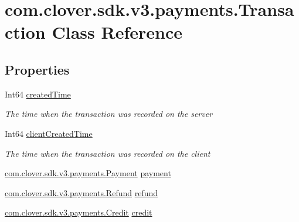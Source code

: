 \hypertarget{classcom_1_1clover_1_1sdk_1_1v3_1_1payments_1_1_transaction}{}\section{com.\+clover.\+sdk.\+v3.\+payments.\+Transaction Class Reference}
\label{classcom_1_1clover_1_1sdk_1_1v3_1_1payments_1_1_transaction}
\subsection*{Properties}
\begin{DoxyCompactItemize}
\item 
Int64 \hyperlink{classcom_1_1clover_1_1sdk_1_1v3_1_1payments_1_1_transaction_af6b65de96af4b8bc55484cdeab72186a}{created\+Time}
\begin{DoxyCompactList}\small\item\em The time when the transaction was recorded on the server \end{DoxyCompactList}\item 
Int64 \hyperlink{classcom_1_1clover_1_1sdk_1_1v3_1_1payments_1_1_transaction_a602c5a8c5bbbdc62370e8eb13b1a0f61}{client\+Created\+Time}
\begin{DoxyCompactList}\small\item\em The time when the transaction was recorded on the client \end{DoxyCompactList}\item 
\hyperlink{classcom_1_1clover_1_1sdk_1_1v3_1_1payments_1_1_payment}{com.\+clover.\+sdk.\+v3.\+payments.\+Payment} \hyperlink{classcom_1_1clover_1_1sdk_1_1v3_1_1payments_1_1_transaction_a833b26554048e1a542b928764b70f72b}{payment}
\item 
\hyperlink{classcom_1_1clover_1_1sdk_1_1v3_1_1payments_1_1_refund}{com.\+clover.\+sdk.\+v3.\+payments.\+Refund} \hyperlink{classcom_1_1clover_1_1sdk_1_1v3_1_1payments_1_1_transaction_aec98ffc2c99453e6820ba9458ec5af07}{refund}
\item 
\hyperlink{classcom_1_1clover_1_1sdk_1_1v3_1_1payments_1_1_credit}{com.\+clover.\+sdk.\+v3.\+payments.\+Credit} \hyperlink{classcom_1_1clover_1_1sdk_1_1v3_1_1payments_1_1_transaction_a9a5a25907281eec6692c67a85a9a1cea}{credit}
\end{DoxyCompactItemize}


